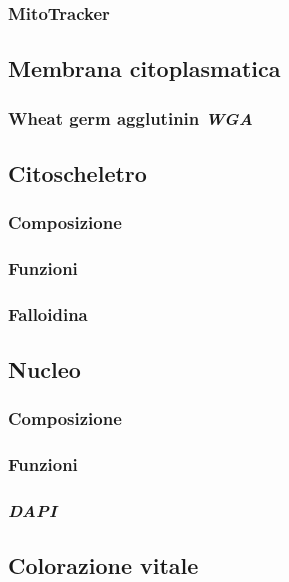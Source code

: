 		\subsubsection{MitoTracker}

	\subsection{Membrana citoplasmatica}

		\subsubsection{Wheat germ agglutinin \emph{WGA}}

	\subsection{Citoscheletro}

		\subsubsection{Composizione}

		\subsubsection{Funzioni}

		\subsubsection{Falloidina}
		
	\subsection{Nucleo}

		\subsubsection{Composizione}

		\subsubsection{Funzioni}

		\subsubsection{\emph{DAPI}}

	\subsection{Colorazione vitale}
		



